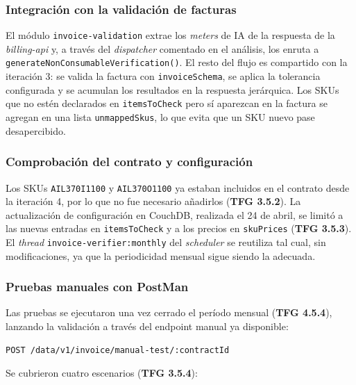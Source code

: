 \subsubsection{Integración con la validación de facturas}

El módulo \texttt{invoice-validation} extrae los \textit{meters} de IA de la respuesta de la \textit{billing-api} y, a través del \textit{dispatcher} comentado en el análisis, los enruta a \texttt{generateNonConsumableVerification()}. El resto del flujo es compartido con la iteración 3: se valida la factura con \texttt{invoiceSchema}, se aplica la tolerancia configurada y se acumulan los resultados en la respuesta jerárquica. Los SKUs que no estén declarados en \texttt{itemsToCheck} pero sí aparezcan en la factura se agregan en una lista \texttt{unmappedSkus}, lo que evita que un SKU nuevo pase desapercibido.

\subsubsection{Comprobación del contrato y configuración}

Los SKUs \texttt{AIL370I1100} y \texttt{AIL370O1100} ya estaban incluidos en el contrato desde la iteración 4, por lo que no fue necesario añadirlos (\textbf{TFG 3.5.2}). La actualización de configuración en CouchDB, realizada el 24 de abril, se limitó a las nuevas entradas en \texttt{itemsToCheck} y a los precios en \texttt{skuPrices} (\textbf{TFG 3.5.3}). El \textit{thread} \texttt{invoice-verifier:monthly} del \textit{scheduler} se reutiliza tal cual, sin modificaciones, ya que la periodicidad mensual sigue siendo la adecuada.

\subsubsection{Pruebas manuales con PostMan}

Las pruebas se ejecutaron una vez cerrado el período mensual (\textbf{TFG 4.5.4}), lanzando la validación a través del endpoint manual ya disponible:

\begin{verbatim}
POST /data/v1/invoice/manual-test/:contractId
\end{verbatim}

Se cubrieron cuatro escenarios (\textbf{TFG 3.5.4}):

